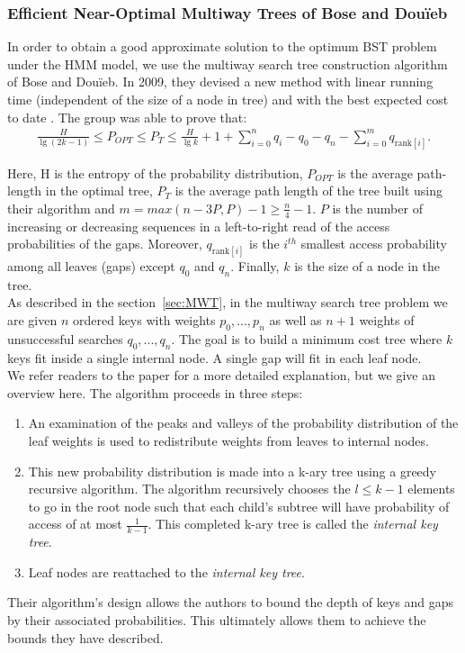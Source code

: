 \documentclass[]{beamer}
\theoremstyle{plain}
\begin{document}
\begin{frame} \frametitle{Efficient Near-Optimal Multiway Trees of Bose and Dou\"{i}eb}\label{43}

In order to obtain a good approximate solution to the optimum BST problem under the HMM model, we use the multiway search tree construction algorithm of Bose and Dou\"{i}eb. In 2009, they devised a new method with linear running time (independent of the size of a node in tree) and with the best expected cost to date \cite{bose2009efficient}. The group was able to prove that:
\begin{align*}
\frac{H}{\lg(2k-1)} \leq P_{OPT} \leq P_T \leq \frac{H}{\lg k} + 1 + \sum_{i=0}^n q_i - q_0 - q_n - \sum_{i=0}^m q_{\text{rank}[i]}.
\end{align*}

Here, H is the entropy of the probability distribution, $P_{OPT}$ is the average path-length in the optimal tree, $P_T$ is the average path length of the tree built using their algorithm and $m=max({n-3P,P})-1 \geq \frac{n}{4} - 1$. $P$ is the number of increasing or decreasing sequences in a left-to-right read of the access probabilities of the gaps. Moreover, $q_{\text{rank}[i]}$ is the $i^{th}$ smallest access probability among all leaves (gaps) except $q_0$ and $q_n$. Finally, $k$ is the size of a node in the tree. \\

As described in the section~\ref{sec:MWT}, in the multiway search tree problem we are given $n$ ordered keys with weights $p_0, ..., p_n$ as well as $n+1$ weights of unsuccessful searches $q_0,...,q_n$. The goal is to build a minimum cost tree where $k$ keys fit inside a single internal node. A single gap will fit in each leaf node. \\
 
We refer readers to the paper \cite{bose2009efficient} for a more detailed explanation, but we give an overview here. The algorithm proceeds in three steps: 
 
\begin{enumerate}
\item An examination of the peaks and valleys of the probability distribution of the leaf weights is used to redistribute weights from leaves to internal nodes. 

\item This new probability distribution is made into a k-ary tree using a greedy recursive algorithm. The algorithm recursively chooses the $l \leq k-1$ elements to go in the root node such that each child's subtree will have probability of access of at most $\frac{1}{k-1}$. This completed k-ary tree is called the \textit{internal key tree}. 

\item Leaf nodes are reattached to the \textit{internal key tree}.
\end{enumerate}

 Their algorithm's design allows the authors to bound the depth of keys and gaps by their associated probabilities. This ultimately allows them to achieve the bounds they have described. 
\end{frame}
\end{document}

